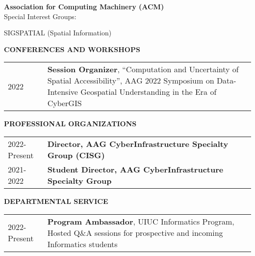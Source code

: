 \documentclass{acmcv}
\begin{document}
    \textbf{Association for Computing Machinery (ACM)} \\
    Special Interest Groups: \\ 
    \begin{titemize}
        \item SIGSPATIAL (Spatial Information)
    \end{titemize}



    \textbf{\uppercase{Conferences and Workshops}}
    \begin{longtable}{p{0.16\linewidth} p{0.84\linewidth}}
        2022 & \textbf{Session Organizer}, ``Computation and Uncertainty of Spatial Accessibility'', AAG 2022 Symposium on Data-Intensive Geospatial Understanding in the Era of CyberGIS\\
    \end{longtable}

    \textbf{\uppercase{Professional Organizations}}
    \begin{longtable}{p{0.16\linewidth} p{0.84\linewidth}}

        2022-Present & \textbf{Director, AAG CyberInfrastructure Specialty Group (CISG)} \\

        2021-2022 & \textbf{Student Director, AAG CyberInfrastructure Specialty Group}
    \end{longtable}

    \textbf{\uppercase{Departmental Service}}
    \begin{longtable}{p{0.16\linewidth} p{0.84\linewidth}}
        2022-Present & \textbf{Program Ambassador}, UIUC Informatics Program, Hosted Q\&A sessions for prospective and incoming Informatics students \\
    \end{longtable}


	
		
		
		
\end{document}
